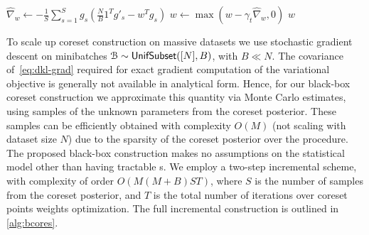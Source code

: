 \begin{algorithm*}[!t]
\begin{algorithmic}[1]
		\EndFor
		\State $\hat\nabla_w \gets -\frac{1}{S}\sum_{s=1}^S g_s\left( \frac{N}{B} 1^Tg'_s- w^Tg_s\right)$
		\label{lst:line:mc-grad}
		\State $w \gets \max(w - \gamma_t\hat\nabla_w, 0)$
		\EndFor
		\EndFor
		\State\Return $w$%
		\EndProcedure		 
	\end{algorithmic}
\end{algorithm*}


To scale up coreset construction on massive datasets we use stochastic gradient descent on minibatches $\mathcal{B} \sim {\sf{UnifSubset}}([N], B)$, with $B \ll N$.
The covariance of~\cref{eq:dkl-grad} required for exact gradient computation of the variational objective is generally not available in analytical form. Hence, for our black-box coreset construction we approximate this quantity via Monte Carlo estimates, using samples of the unknown parameters from the coreset posterior. These samples can be efficiently obtained with complexity $O(M)$ (not scaling with dataset size $N$) due to the sparsity of the coreset posterior over the procedure. The proposed black-box construction makes no assumptions on the statistical model other than having tractable \blik{}s. We employ a two-step incremental scheme, with complexity of order $O\left(M(M+B)ST\right)$, where $S$ is the number of samples from the coreset posterior, and $T$ is the total number of iterations over coreset points weights optimization. The full incremental construction is outlined in \cref{alg:bcores}.


